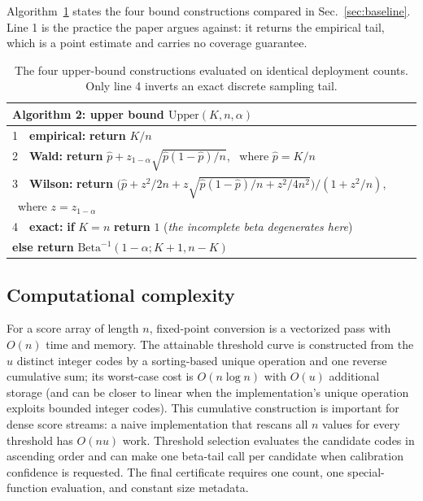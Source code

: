 \documentclass[preprint,12pt]{elsarticle}
\begin{document}
Algorithm~\ref{alg:baseline} states the four bound constructions compared in
Sec.~\ref{sec:baseline}.  Line 1 is the practice the paper argues against: it
returns the empirical tail, which is a point estimate and carries no coverage
guarantee.

\begin{table}[t]
\centering\small
\caption{The four upper-bound constructions evaluated on identical deployment
counts.  Only line 4 inverts an exact discrete sampling tail.}
\label{alg:baseline}
\begin{tabular}{@{}p{}@{}}
\toprule
\textbf{Algorithm 2:} upper bound $\mathrm{Upper}(K,n,\alpha)$ \\
\midrule
1\ \ \textbf{empirical:} \textbf{return} $K/n$ \\
2\ \ \textbf{Wald:} \textbf{return} $\hat p + z_{1-\alpha}
\sqrt{\hat p (1-\hat p)/n}$, \ where $\hat p = K/n$ \\
3\ \ \textbf{Wilson:} \textbf{return}
$\big(\hat p + z^2/2n + z\sqrt{\hat p(1-\hat p)/n + z^2/4n^2}\big)/(1+z^2/n)$,
\ where $z = z_{1-\alpha}$ \\
4\ \ \textbf{exact:} \textbf{if} $K = n$ \textbf{return} $1$
\quad (\textit{the incomplete beta degenerates here}) \\
\hspace*{2.2em} \textbf{else return}
$\mathrm{Beta}^{-1}(1-\alpha; K+1, n-K)$ \\
\bottomrule
\end{tabular}
\end{table}

\subsection{Computational complexity}

For a score array of length $n$, fixed-point conversion is a vectorized pass
with $O(n)$ time and memory.  The attainable threshold curve is constructed
from the $u$ distinct integer codes by a sorting-based unique operation and one
reverse cumulative sum; its worst-case cost is $O(n\log n)$ with $O(u)$
additional storage (and can be closer to linear when the implementation's
unique operation exploits bounded integer codes).  This cumulative construction
is important for dense score streams: a naive implementation that
rescans all $n$ values for every threshold has $O(nu)$ work.  Threshold selection
evaluates the candidate codes in ascending order and can make one beta-tail
call per candidate when calibration confidence is requested.  The final
certificate requires one count, one special-function evaluation, and constant
size metadata.
\end{document}

